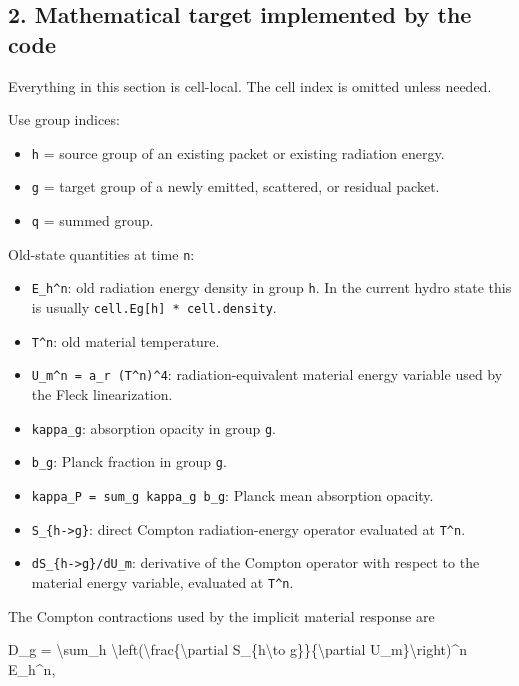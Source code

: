 \documentclass[
]{article}
\newenvironment{Shaded}{}{}
\newcommand{\NormalTok}[1]{#1}
\providecommand{\tightlist}{%
  \setlength{\itemsep}{0pt}\setlength{\parskip}{0pt}}
\begin{document}
\subsection{2. Mathematical target implemented by the
code}\label{mathematical-target-implemented-by-the-code}

Everything in this section is cell-local. The cell index is omitted
unless needed.

Use group indices:

\begin{itemize}
\tightlist
\item
  \texttt{h} = source group of an existing packet or existing radiation
  energy.
\item
  \texttt{g} = target group of a newly emitted, scattered, or residual
  packet.
\item
  \texttt{q} = summed group.
\end{itemize}

Old-state quantities at time \texttt{n}:

\begin{itemize}
\tightlist
\item
  \texttt{E\_h\^{}n}: old radiation energy density in group \texttt{h}.
  In the current hydro state this is usually
  \texttt{cell.Eg{[}h{]}\ *\ cell.density}.
\item
  \texttt{T\^{}n}: old material temperature.
\item
  \texttt{U\_m\^{}n\ =\ a\_r\ (T\^{}n)\^{}4}: radiation-equivalent
  material energy variable used by the Fleck linearization.
\item
  \texttt{kappa\_g}: absorption opacity in group \texttt{g}.
\item
  \texttt{b\_g}: Planck fraction in group \texttt{g}.
\item
  \texttt{kappa\_P\ =\ sum\_g\ kappa\_g\ b\_g}: Planck mean absorption
  opacity.
\item
  \texttt{S\_\{h-\textgreater{}g\}}: direct Compton radiation-energy
  operator evaluated at \texttt{T\^{}n}.
\item
  \texttt{dS\_\{h-\textgreater{}g\}/dU\_m}: derivative of the Compton
  operator with respect to the material energy variable, evaluated at
  \texttt{T\^{}n}.
\end{itemize}

The Compton contractions used by the implicit material response are

\begin{Shaded}
\begin{Highlighting}[]
\NormalTok{D\_g = \textbackslash{}sum\_h \textbackslash{}left(\textbackslash{}frac\{\textbackslash{}partial S\_\{h\textbackslash{}to g\}\}\{\textbackslash{}partial U\_m\}\textbackslash{}right)\^{}n E\_h\^{}n,}
\end{Highlighting}
\end{Shaded}
\end{document}
